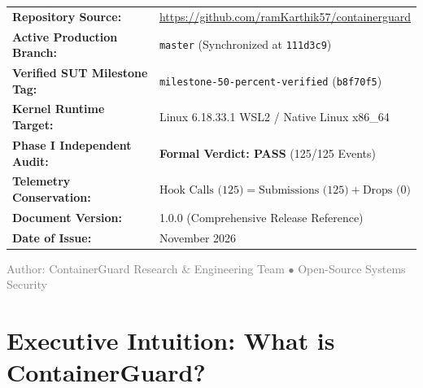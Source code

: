 \documentclass[11pt,a4paper]{article}
\begin{document}
\begin{titlepage}
\begin{center}
\begin{minipage}{0.92\textwidth}
\begin{tcolorbox}[
  enhanced,
  colback=boxbg,
  colframe=boxframe,
  arc=2mm,
  boxrule=1pt,
  title={\textbf{\textcolor{primary}{Executive Document Metadata \& Provenance}}},
  fonttitle=\normalsize
]
\small
\begin{tabularx}{\linewidth}{>{\raggedright\arraybackslash}p{4.8cm} X}
\textbf{Repository Source:} & \url{https://github.com/ramKarthik57/containerguard} \\
\textbf{Active Production Branch:} & \texttt{master} (Synchronized at \texttt{111d3c9}) \\
\textbf{Verified SUT Milestone Tag:} & \texttt{milestone-50-percent-verified} (\texttt{b8f70f5}) \\
\textbf{Kernel Runtime Target:} & Linux 6.18.33.1 WSL2 / Native Linux x86\_64 \\
\textbf{Phase I Independent Audit:} & \textbf{Formal Verdict: PASS} (125/125 Events) \\
\textbf{Telemetry Conservation:} & $\text{Hook Calls (125)} = \text{Submissions (125)} + \text{Drops (0)}$ \\
\textbf{Document Version:} & 1.0.0 (Comprehensive Release Reference) \\
\textbf{Date of Issue:} & November 2026 \\
\end{tabularx}
\end{tcolorbox}
\end{minipage}

\vfill

{\small \textcolor{gray}{Author: ContainerGuard Research \& Engineering Team $\bullet$ Open-Source Systems Security}}
\end{center}
\end{titlepage}
\newpage


\tableofcontents
\newpage


\section{Executive Intuition: What is ContainerGuard?}
\end{document}
